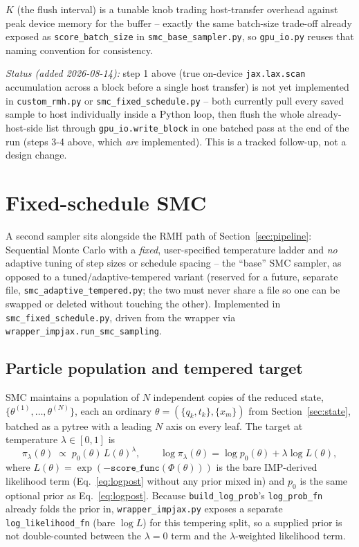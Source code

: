 \documentclass[11pt]{article}
\begin{document}
$K$ (the flush interval) is a tunable knob trading host-transfer overhead
against peak device memory for the buffer -- exactly the same
batch-size trade-off already exposed as \texttt{score\_batch\_size} in
\texttt{smc\_base\_sampler.py}, so \texttt{gpu\_io.py} reuses that naming
convention for consistency.

\emph{Status (added 2026-08-14):} step 1 above (true on-device
\texttt{jax.lax.scan} accumulation across a block before a single host
transfer) is not yet implemented in \texttt{custom\_rmh.py} or
\texttt{smc\_fixed\_schedule.py} -- both currently pull every saved sample
to host individually inside a Python loop, then flush the whole
already-host-side list through \texttt{gpu\_io.write\_block} in one batched
pass at the end of the run (steps 3-4 above, which \emph{are} implemented).
This is a tracked follow-up, not a design change.

\section{Fixed-schedule SMC}
\label{sec:smc}

A second sampler sits alongside the RMH path of Section~\ref{sec:pipeline}:
Sequential Monte Carlo with a \emph{fixed}, user-specified temperature
ladder and \emph{no} adaptive tuning of step sizes or schedule spacing --
the ``base'' SMC sampler, as opposed to a tuned/adaptive-tempered variant
(reserved for a future, separate file, \texttt{smc\_adaptive\_tempered.py};
the two must never share a file so one can be swapped or deleted without
touching the other). Implemented in \texttt{smc\_fixed\_schedule.py}, driven
from the wrapper via \texttt{wrapper\_impjax.run\_smc\_sampling}.

\subsection{Particle population and tempered target}

SMC maintains a population of $N$ independent copies of the reduced state,
$\{\theta^{(1)}, \dots, \theta^{(N)}\}$, each an ordinary
$\theta = (\{q_k,t_k\}, \{x_m\})$ from Section~\ref{sec:state}, batched as a
pytree with a leading $N$ axis on every leaf. The target at temperature
$\lambda \in [0,1]$ is
\[
  \pi_\lambda(\theta) \;\propto\; p_0(\theta)\, L(\theta)^\lambda, \qquad
  \log \pi_\lambda(\theta) = \log p_0(\theta) + \lambda \log L(\theta),
\]
where $L(\theta) = \exp(-\texttt{score\_func}(\Phi(\theta)))$ is the bare
IMP-derived likelihood term (Eq.~\eqref{eq:logpost} without any prior mixed
in) and $p_0$ is the same optional prior as Eq.~\eqref{eq:logpost}. Because
\texttt{build\_log\_prob}'s \texttt{log\_prob\_fn} already folds the prior
in, \texttt{wrapper\_impjax.py} exposes a separate
\texttt{log\_likelihood\_fn} (bare $\log L$) for this tempering split, so a
supplied prior is not double-counted between the $\lambda=0$ term and the
$\lambda$-weighted likelihood term.
\end{document}
